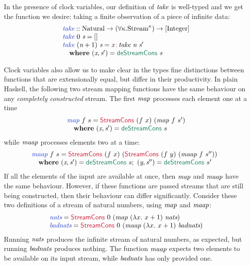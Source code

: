 In the presence of clock variables, our definition of $\textit{take}$
is well-typed and we get the function we desire: taking a finite
observation of a piece of infinite data:
\begin{displaymath}
  \begin{array}{l}
    \defn{take} :: \tyname{Natural} \to (\forall \kappa. \tyname{Stream}^\kappa) \to [\tyname{Integer}] \\
    \defn{take}\ 0\ \ident{s} = [] \\
    \defn{take}\ (\ident{n}+1)\ \ident{s} = \ident{x} \mathop{\cons{:}} \ident{take}\ \ident{n}\ \ident{s$'$} \\
    \quad \kw{where}\ (\ident{x}, \ident{s$'$}) = \elim{deStreamCons}\ \ident{s}
  \end{array}
\end{displaymath}

Clock variables also allow us to make clear in the types fine
distinctions between functions that are extensionally equal, but
differ in their productivity. In plain Haskell, the following two
stream mapping functions have the same behaviour on any
\emph{completely constructed} stream. The first $\textit{map}$
processes each element one at a time
\begin{displaymath}
  \begin{array}{l}
    \defn{map}~f~s = \cons{StreamCons}~(f~x)~(\ident{map}~f~s') \\
    \quad \kw{where}~(\ident{x}, \ident{s$'$}) = \elim{deStreamCons}~s
  \end{array}
\end{displaymath}
while $\textit{maap}$ processes elements two at a time:
\begin{displaymath}
  \begin{array}{@{}l}
    \defn{maap}~f~s = \cons{StreamCons}~(f~x)~(\cons{StreamCons}~(f~y)~(\ident{maap}~f~s'')) \\
    \quad \kw{where}~(\ident{x}, \ident{s$'$}) = \elim{deStreamCons}~s;~(\ident{y}, \ident{s$''$}) = \elim{deStreamCons}~s'
  \end{array}
\end{displaymath}
If all the elements of the input are available at once, then
$\textit{map}$ and $\textit{maap}$ have the same behaviour. However, if
these functions are passed streams that are still being constructed,
then their behaviour can differ significantly. Consider these two
definitions of a stream of natural numbers, using $\textit{map}$ and $\textit{maap}$:
\begin{displaymath}
  \begin{array}{l}
    \defn{nats} = \cons{StreamCons}~0~(\ident{map}~(\lambda x.~x+1)~\ident{nats})\\
    \defn{badnats} = \cons{StreamCons}~0~(\ident{maap}~(\lambda x.~x+1)~\ident{badnats})
  \end{array}
\end{displaymath}
Running $\textit{nats}$ produces the infinite stream of natural
numbers, as expected, but running $\textit{badnats}$ produces
nothing. The function $\textit{maap}$ expects two elements to be
available on its input stream, while $\textit{badnats}$ has only
provided one.

